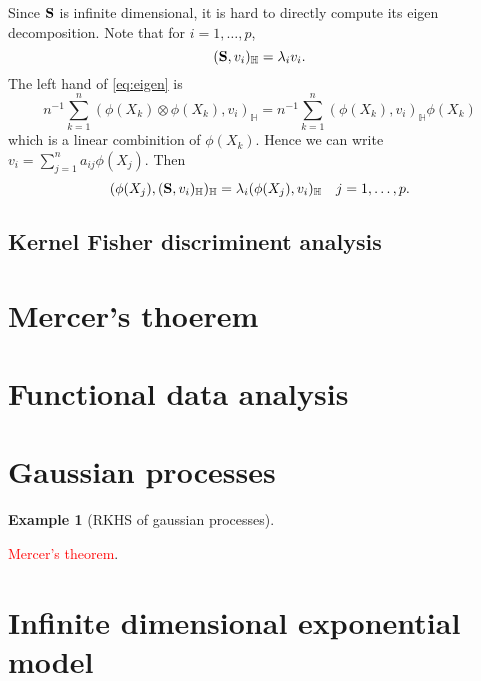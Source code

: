 \documentclass[11pt]{article}
\newcommand\CG[1]{\textcolor{red}{#1}}
\theoremstyle{plain}
\newtheorem{example}{Example}
\theoremstyle{definition}
\theoremstyle{remark}
\begin{document}
Since $\mathbf{S}$ is infinite dimensional, it is hard to directly compute its eigen decomposition.
Note that for $i=1,\ldots, p$,
\begin{equation}\label{eq:eigen}
    (\mathbf{S}, v_i)_{\mathbb H}=\lambda_i v_i.
\end{equation}
The left hand of \eqref{eq:eigen} is
\begin{equation*}
n^{-1}\sum_{k=1}^n
(
     \phi(X_k) \otimes \phi(X_k)
    , v_i)_{\mathbb H}
    =
n^{-1}\sum_{k=1}^n
     (\phi(X_k)
    , v_i)_{\mathbb H}\phi(X_k) 
\end{equation*}
which is a linear combinition of $\phi(X_k)$.
Hence we can write $v_i=\sum_{j=1}^n a_{ij}\phi(X_j)$.
Then
\begin{equation*}
    (\phi(X_j),(\mathbf{S}, v_i)_{\mathbb H})_{\mathbb H}=\lambda_i (\phi(X_j), v_i)_{\mathbb H}  \quad j=1,\ldots, p.
\end{equation*}







\subsection{Kernel Fisher discriminent analysis}
\cite{914517}


\section{Mercer's thoerem}


\section{Functional data analysis}
\cite{book:1323324}

\section{Gaussian processes}
\begin{example}[RKHS of gaussian processes]
\end{example}




\CG{Mercer's theorem}.

\section{Infinite dimensional exponential model}







\end{document}
